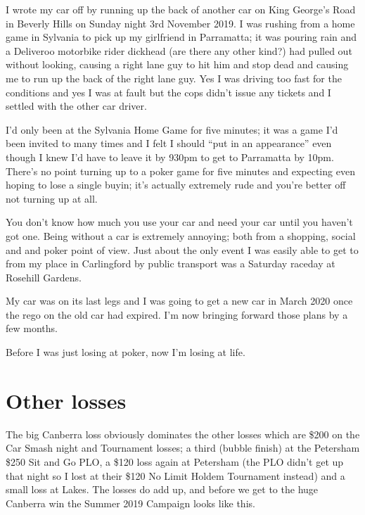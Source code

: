I wrote my car off by running up the back of another car on King
George's Road in Beverly Hills on Sunday night 3rd November 2019.
I was rushing from a home game in Sylvania to pick up my girlfriend in
Parramatta; it was pouring rain and a Deliveroo motorbike
rider dickhead (are there any other kind?) had pulled out without
looking, causing a right lane guy to hit him and stop dead and causing
me to run up the back of the right lane guy. Yes I was driving too
fast for the conditions and yes I was at fault but the cops didn't
issue any tickets and I settled with the other car driver.

I'd only been at the Sylvania Home Game for five minutes; it was a
game I'd been invited to many times and I felt I should ``put in an
appearance'' even though I knew I'd have to leave it by 930pm to get
to Parramatta by 10pm. There's no point turning up to a poker game for
five minutes and expecting even hoping to lose a single buyin; it's
actually extremely rude and you're better off not turning up at all.

You don't know how much you use your car and need your car until you
haven't got one. Being without a car is extremely annoying; both from
a shopping, social and and poker point of view. Just about the only
event I was easily able to get to from my place in Carlingford by
public transport was a Saturday raceday at Rosehill Gardens.

My car was on its last legs and I was going to get a new car in March
2020 once the rego on the old car had expired. I'm now bringing
forward those plans by a few months.

Before I was just losing at poker, now I'm losing at life.

\section*{Other losses}

The big Canberra loss obviously dominates the other losses which are
\$200 on the Car Smash night and Tournament losses; a third (bubble
finish) at the Petersham \$250 Sit and Go PLO, a \$120 loss again at
Petersham (the PLO didn't get up that night so I lost at their \$120
No Limit Holdem Tournament instead) and a small loss at Lakes. The
losses do add up, and before we get to the huge Canberra win the
Summer 2019 Campaign looks like this.

